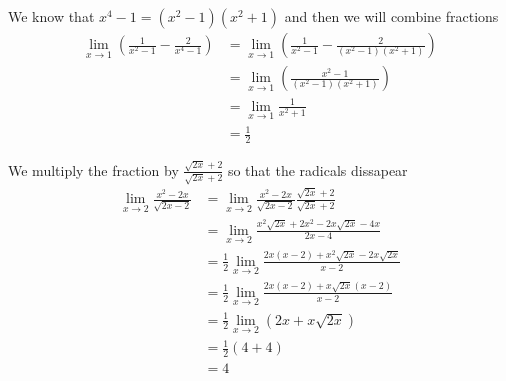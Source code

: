 \documentclass[working]{tuftebook}
\begin{document}
\newpage
\begin{solutions}
    \item{We know that $x^4-1=(x^2-1)(x^2+1)$ and then we will combine fractions
            \begin{align*}
                \lim_{x\to 1} \left( \frac{1}{x^2-1}- \frac{2}{x^4-1} \right)&= \lim_{x\to 1} \left( \frac{1}{x^2-1}- \frac{2}{(x^2-1)(x^2+1)} \right)\\ 
                                                                             &= \lim_{x\to 1} \left( \frac{x^2-1}{(x^2-1)(x^2+1)} \right)\\ 
                                                                             &= \lim_{x\to 1} \frac{1}{x^2+1}\\ 
                                                                             &= \frac{1}{2}
            \end{align*}
        }
    \item{We multiply the fraction by $\displaystyle \frac{ \sqrt{2x}+2}{ \sqrt{2x}+2}$ so that the radicals dissapear
            \begin{align*}
                \lim_{x\to 2} \frac{x^2-2x}{ \sqrt{2x-2}}&= \lim_{x\to 2} \frac{x^2-2x}{ \sqrt{2x-2}} \frac{ \sqrt{2x}+2}{ \sqrt{2x}+2}\\ 
                                                         &= \lim_{x\to 2} \frac{x^2 \sqrt{2x}+2x^2-2x \sqrt{2x}-4x}{2x-4}\\ 
                                                         &= \frac{1}{2} \lim_{x\to 2} \frac{2x(x-2)+x^2 \sqrt{2x}-2x \sqrt{2x}}{x-2}\\ 
                                                         &= \frac{1}{2} \lim_{x\to 2} \frac{2x(x-2)+x \sqrt{2x}(x-2)}{x-2}\\ 
                                                         &= \frac{1}{2} \lim_{x\to 2}(2x+x \sqrt{2x})\\ 
                                                         &= \frac{1}{2}(4+4)\\ 
                                                         &= 4
            \end{align*}
        }
\end{solutions}
\end{document}
